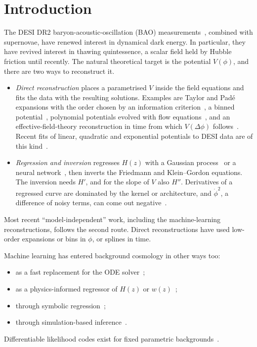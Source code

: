 \documentclass[11pt,a4paper]{article}
\begin{document}
\section{Introduction}
The DESI DR2 baryon-acoustic-oscillation (BAO) measurements~\cite{2503.14738}, combined with supernovae, have renewed interest in dynamical dark energy. In particular, they have revived interest in thawing quintessence, a scalar field held by Hubble friction until recently.
The natural theoretical target is the potential $V(\phi)$, and there are two ways to reconstruct it.
\begin{itemize}
\item \emph{Direct reconstruction} places a parametrised $V$ inside the field equations and fits the data with the resulting solutions. Examples are Taylor and Pad\'e expansions with the order chosen by an information criterion~\cite{astro-ph_0506696,astro-ph_0610812}, a binned potential~\cite{astro-ph_0611093}, polynomial potentials evolved with flow equations~\cite{astro-ph_0610427}, and an effective-field-theory reconstruction in time from which $V(\Delta\phi)$ follows~\cite{2101.04666}. Recent fits of linear, quadratic and exponential potentials to DESI data are of this kind~\cite{2505.10662,2405.17396,2404.14341,2506.13047,2506.21542}.
\item \emph{Regression and inversion} regresses $H(z)$ with a Gaussian process~\cite{2203.06767,2112.09722,2305.04752,2603.21125,2604.04056,2608.24433,2411.00051} or a neural network~\cite{2305.15500}, then inverts the Friedmann and Klein--Gordon equations. The inversion needs $H'$, and for the slope of $V$ also $H''$. Derivatives of a regressed curve are dominated by the kernel or architecture, and $\dot\phi^2$, a difference of noisy terms, can come out negative~\cite{2603.21125}.
\end{itemize}
Most recent ``model-independent'' work, including the machine-learning reconstructions, follows the second route. Direct reconstructions have used low-order expansions or bins in $\phi$, or splines in time.

Machine learning has entered background cosmology in other ways too:
\begin{itemize}
\item as a fast replacement for the ODE solver~\cite{2205.02945,2311.15955,2506.05674};
\item as a physics-informed regressor of $H(z)$ or $w(z)$~\cite{2403.13899,2605.30139,2606.17614};
\item through symbolic regression~\cite{2211.11461,2502.10506,2606.17951};
\item through simulation-based inference~\cite{2606.16248,2412.12323}.
\end{itemize}
Differentiable likelihood codes exist for fixed parametric backgrounds~\cite{2302.05163,2606.28175,2609.28458}.
\end{document}
